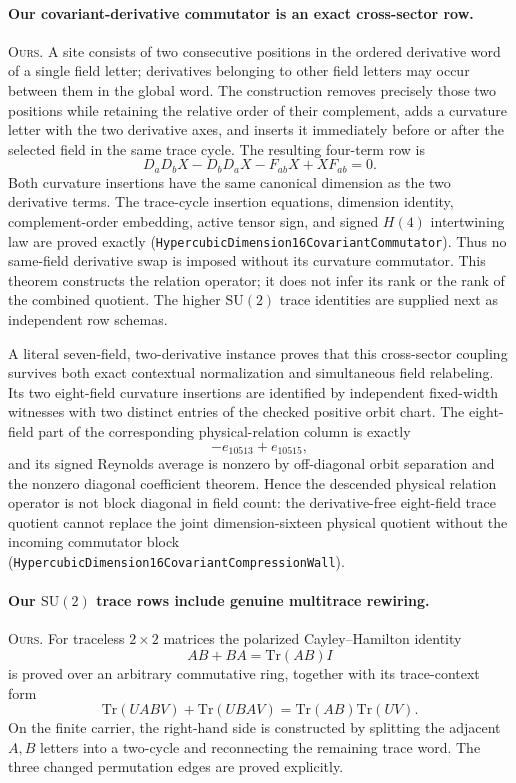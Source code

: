 \documentclass[11pt]{article}
\theoremstyle{definition}
\newcommand{\Tr}{\mathrm{Tr}}
\begin{document}
\paragraph{Our covariant-derivative commutator is an exact cross-sector
row.}
\textsc{Ours.} A site consists of two consecutive positions in the ordered
derivative word of a single field letter; derivatives belonging to other
field letters may occur between them in the global word.  The construction
removes precisely those two positions while retaining the relative order of
their complement, adds a curvature letter with the two derivative axes, and
inserts it immediately before or after the selected field in the same trace
cycle.  The resulting four-term row is
\[
 D_aD_bX-D_bD_aX-F_{ab}X+XF_{ab}=0.
\]
Both curvature insertions have the same canonical dimension as the two
derivative terms.  The trace-cycle insertion equations, dimension identity,
complement-order embedding, active tensor sign, and signed $H(4)$
intertwining law are proved exactly
(\texttt{HypercubicDimension16CovariantCommutator}).  Thus no same-field
derivative swap is imposed without its curvature commutator.  This theorem
constructs the relation operator; it does not infer its rank or the rank of
the combined quotient.  The higher $\mathrm{SU}(2)$ trace identities are
supplied next as independent row schemas.

A literal seven-field, two-derivative instance proves that this
cross-sector coupling survives both exact contextual normalization and
simultaneous field relabeling.  Its two eight-field curvature insertions are
identified by independent fixed-width witnesses with two distinct entries of
the checked positive orbit chart.  The eight-field part of the corresponding
physical-relation column is exactly
\[
  -e_{10513}+e_{10515},
\]
and its signed Reynolds average is nonzero by off-diagonal orbit separation
and the nonzero diagonal coefficient theorem.  Hence the descended physical
relation operator is not block diagonal in field count: the derivative-free
eight-field trace quotient cannot replace the joint dimension-sixteen
physical quotient without the incoming commutator block
(\texttt{HypercubicDimension16CovariantCompressionWall}).

\paragraph{Our $\mathrm{SU}(2)$ trace rows include genuine multitrace
rewiring.}
\textsc{Ours.} For traceless $2\times2$ matrices the polarized
Cayley--Hamilton identity
\[
 AB+BA=\Tr(AB)I
\]
is proved over an arbitrary commutative ring, together with its trace-context
form
\[
 \Tr(UABV)+\Tr(UBAV)=\Tr(AB)\Tr(UV).
\]
On the finite carrier, the right-hand side is constructed by splitting the
adjacent $A,B$ letters into a two-cycle and reconnecting the remaining trace
word.  The three changed permutation edges are proved explicitly.
\end{document}
